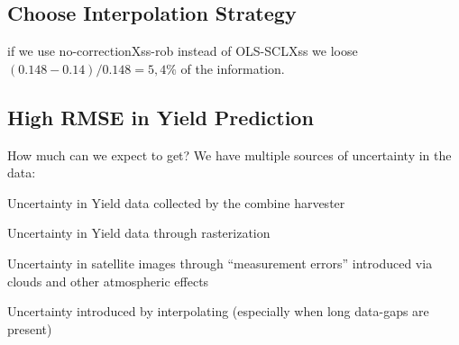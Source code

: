 {    \subsection{Choose Interpolation Strategy}\label{sec:discussion_iplfstrategy-choose}
        if we use no-correctionXss-rob instead of OLS-SCLXss we loose $(0.148-0.14)/0.148 = 5,4\%$ of the information.
    \subsection{High RMSE in Yield Prediction}{\label{sec:discuss_high-rmse-in-yield-prdiction}
        How much can we expect to get? We have multiple sources of uncertainty in the data:
        \begin{Nenumerate}
            \item Uncertainty in Yield data collected by the combine harvester
            \item Uncertainty in Yield data through rasterization
            \item Uncertainty in satellite images through ``measurement errors'' introduced via clouds and other atmospheric effects 
            \item Uncertainty introduced by interpolating (especially when long data-gaps are present)
        \end{Nenumerate}
    }
}

